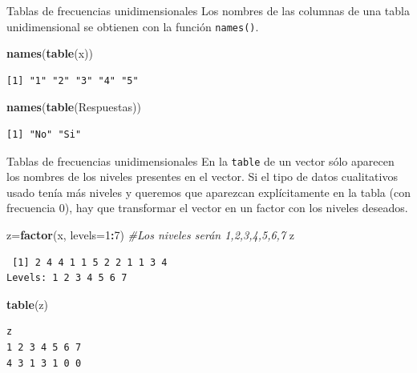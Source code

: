 \documentclass[
  ignorenonframetext,
  aspectratio=169]{beamer}
\newenvironment{Shaded}{\begin{snugshade}}{\end{snugshade}}
\newcommand{\AttributeTok}[1]{\textcolor[rgb]{0.13,0.29,0.53}{#1}}
\newcommand{\CommentTok}[1]{\textcolor[rgb]{0.56,0.35,0.01}{\textit{#1}}}
\newcommand{\DecValTok}[1]{\textcolor[rgb]{0.00,0.00,0.81}{#1}}
\newcommand{\FunctionTok}[1]{\textcolor[rgb]{0.13,0.29,0.53}{\textbf{#1}}}
\newcommand{\NormalTok}[1]{#1}
\newcommand{\OtherTok}[1]{\textcolor[rgb]{0.56,0.35,0.01}{#1}}
\newcommand{\SpecialCharTok}[1]{\textcolor[rgb]{0.81,0.36,0.00}{\textbf{#1}}}
\begin{document}
\begin{frame}[fragile]{Tablas de frecuencias unidimensionales}
\label{tablas-de-frecuencias-unidimensionales-3}
Los nombres de las columnas de una tabla unidimensional se obtienen con
la función \texttt{names()}.

\begin{Shaded}
\begin{Highlighting}[]
\FunctionTok{names}\NormalTok{(}\FunctionTok{table}\NormalTok{(x))}
\end{Highlighting}
\end{Shaded}

\begin{verbatim}
[1] "1" "2" "3" "4" "5"
\end{verbatim}

\begin{Shaded}
\begin{Highlighting}[]
\FunctionTok{names}\NormalTok{(}\FunctionTok{table}\NormalTok{(Respuestas))}
\end{Highlighting}
\end{Shaded}

\begin{verbatim}
[1] "No" "Si"
\end{verbatim}
\end{frame}

\begin{frame}[fragile]{Tablas de frecuencias unidimensionales}
\label{tablas-de-frecuencias-unidimensionales-4}
En la \texttt{table} de un vector sólo aparecen los nombres de los
niveles presentes en el vector. Si el tipo de datos cualitativos usado
tenía más niveles y queremos que aparezcan explícitamente en la tabla
(con frecuencia 0), hay que transformar el vector en un factor con los
niveles deseados.

\begin{Shaded}
\begin{Highlighting}[]
\NormalTok{z}\OtherTok{=}\FunctionTok{factor}\NormalTok{(x, }\AttributeTok{levels=}\DecValTok{1}\SpecialCharTok{:}\DecValTok{7}\NormalTok{) }\CommentTok{\#Los niveles serán 1,2,3,4,5,6,7 }
\NormalTok{z}
\end{Highlighting}
\end{Shaded}

\begin{verbatim}
 [1] 2 4 4 1 1 5 2 2 1 1 3 4
Levels: 1 2 3 4 5 6 7
\end{verbatim}

\begin{Shaded}
\begin{Highlighting}[]
\FunctionTok{table}\NormalTok{(z)}
\end{Highlighting}
\end{Shaded}

\begin{verbatim}
z
1 2 3 4 5 6 7 
4 3 1 3 1 0 0 
\end{verbatim}
\end{frame}
\end{document}

